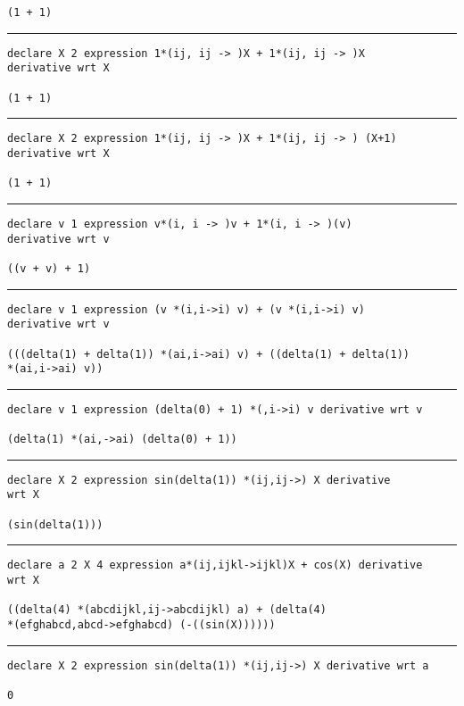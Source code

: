 \documentclass[12pt, a4paper]{report} %
\begin{document}
\begin{multicols}{2}
\begin{verbatim}
(1 + 1)
\end{verbatim}
\vspace{-20pt} \rule[-10pt]{\columnwidth}{0.1pt} 
\begin{verbatim}
declare X 2 expression 1*(ij, ij -> )X + 1*(ij, ij -> )X 
derivative wrt X

(1 + 1)
\end{verbatim}
\vspace{-20pt} \rule[-10pt]{\columnwidth}{0.1pt} 
\begin{verbatim}
declare X 2 expression 1*(ij, ij -> )X + 1*(ij, ij -> ) (X+1) 
derivative wrt X

(1 + 1)
\end{verbatim}
\vspace{-20pt} \rule[-10pt]{\columnwidth}{0.1pt} 
\begin{verbatim}
declare v 1 expression v*(i, i -> )v + 1*(i, i -> )(v) 
derivative wrt v

((v + v) + 1)
\end{verbatim}
\vspace{-20pt} \rule[-10pt]{\columnwidth}{0.1pt} 
\begin{verbatim}
declare v 1 expression (v *(i,i->i) v) + (v *(i,i->i) v) 
derivative wrt v

(((delta(1) + delta(1)) *(ai,i->ai) v) + ((delta(1) + delta(1)) 
*(ai,i->ai) v))
\end{verbatim}
\vspace{-20pt} \rule[-10pt]{\columnwidth}{0.1pt} 
\begin{verbatim}
declare v 1 expression (delta(0) + 1) *(,i->i) v derivative wrt v

(delta(1) *(ai,->ai) (delta(0) + 1))
\end{verbatim}
\vspace{-20pt} \rule[-10pt]{\columnwidth}{0.1pt} 
\begin{verbatim}
declare X 2 expression sin(delta(1)) *(ij,ij->) X derivative 
wrt X

(sin(delta(1)))
\end{verbatim}
\vspace{-20pt} \rule[-10pt]{\columnwidth}{0.1pt} 
\begin{verbatim}
declare a 2 X 4 expression a*(ij,ijkl->ijkl)X + cos(X) derivative 
wrt X

((delta(4) *(abcdijkl,ij->abcdijkl) a) + (delta(4) 
*(efghabcd,abcd->efghabcd) (-((sin(X))))))
\end{verbatim}
\vspace{-20pt} \rule[-10pt]{\columnwidth}{0.1pt} 
\begin{verbatim}
declare X 2 expression sin(delta(1)) *(ij,ij->) X derivative wrt a

0
\end{verbatim}
\end{multicols}
\end{document}
